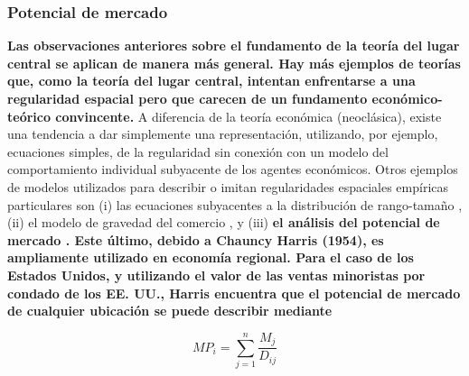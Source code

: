 \subsubsection{Potencial de mercado}
\textbf{Las observaciones anteriores sobre el fundamento de la teoría del lugar central se aplican de manera más general. Hay más ejemplos de teorías que, como la teoría del lugar central, intentan enfrentarse a una regularidad espacial pero que carecen de un fundamento económico-teórico convincente.} A diferencia de la teoría económica (neoclásica), existe una tendencia a dar simplemente una representación, utilizando, por ejemplo, ecuaciones simples, de la regularidad sin conexión con un modelo del comportamiento individual subyacente de los agentes económicos. Otros ejemplos de modelos utilizados para describir o imitan regularidades espaciales empíricas particulares son (i) las ecuaciones subyacentes a la distribución de rango-tamaño , (ii) el modelo de gravedad del comercio , y (iii) \textbf{el análisis del potencial de mercado . Este último, debido a Chauncy Harris (1954), es ampliamente utilizado en economía regional. Para el caso de los Estados Unidos, y utilizando el valor de las ventas minoristas por condado de los EE. UU., Harris encuentra que el potencial de mercado de cualquier ubicación se puede describir mediante}

\begin{equation}
    MP_i = \sum_{j=1}^n \dfrac{M_j}{D_{ij}}
\end{equation}

